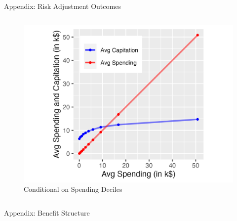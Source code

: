 \documentclass[professionalfonts, aspectratio=169]{beamer}
\begin{document}
\begin{frame}{Appendix: Risk Adjustment Outcomes}
\begin{columns}
\begin{column}{0.5\textwidth}
\begin{figure}
        \includegraphics[width=1\textwidth]{figures/images/avg_spending_vs_capitation_by_spending_deciles.png}
        \caption{Conditional on Spending Deciles}
      \end{figure}
    \end{column}
    
  \end{columns}
\end{frame}

\begin{frame}{Appendix: Benefit Structure}
  \begin{figure}
    \begin{figure}
      \centering
      \resizebox{0.8\textwidth}{!}{}
    \end{figure}
  \end{figure}
\end{frame}
\end{document}
